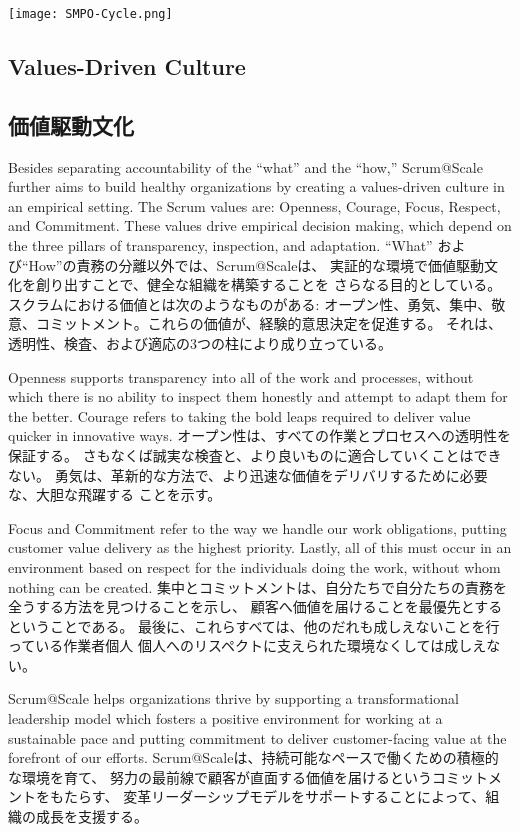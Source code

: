 \documentclass[12pt,a4paper,parskip=full]{scrartcl}
\begin{document}
\texttt{[image: SMPO-Cycle.png]}

\subsection{Values-Driven Culture}
\fi
\subsection{価値駆動文化}
Besides separating accountability of the ``what'' and the ``how,''
Scrum@Scale further aims to build healthy organizations by creating a
values-driven culture in an empirical setting. The Scrum values are:
Openness, Courage, Focus, Respect, and Commitment. These values drive
empirical decision making, which depend on the three pillars of
transparency, inspection, and adaptation.
\fi
``What'' および``How''の責務の分離以外では、Scrum@Scaleは、
実証的な環境で価値駆動文化を創り出すことで、健全な組織を構築することを
さらなる目的としている。スクラムにおける価値とは次のようなものがある: 
オープン性、勇気、集中、敬意、コミットメント。これらの価値が、経験的意思決定を促進する。
それは、透明性、検査、および適応の3つの柱により成り立っている。

Openness supports transparency into all of the work and processes, without
which there is no ability to inspect them honestly and attempt to adapt
them for the better. Courage refers to taking the bold leaps required to
deliver value quicker in innovative ways.
\fi
オープン性は、すべての作業とプロセスへの透明性を保証する。
さもなくば誠実な検査と、より良いものに適合していくことはできない。
勇気は、革新的な方法で、より迅速な価値をデリバリするために必要な、大胆な飛躍する
ことを示す。

Focus and Commitment refer to the way we handle our work obligations,
putting customer value delivery as the highest priority. Lastly, all of
this must occur in an environment based on respect for the individuals
doing the work, without whom nothing can be created.
\fi
集中とコミットメントは、自分たちで自分たちの責務を全うする方法を見つけることを示し、
顧客へ価値を届けることを最優先とするということである。
最後に、これらすべては、他のだれも成しえないことを行っている作業者個人
個人へのリスペクトに支えられた環境なくしては成しえない。

Scrum@Scale helps organizations thrive by supporting a
transformational leadership model which fosters a positive environment for
working at a sustainable pace and putting commitment to deliver
customer-facing value at the forefront of our efforts.
\fi
Scrum@Scaleは、持続可能なペースで働くための積極的な環境を育て、
努力の最前線で顧客が直面する価値を届けるというコミットメントをもたらす、
変革リーダーシップモデルをサポートすることによって、組織の成長を支援する。
\end{document}
